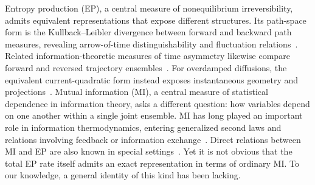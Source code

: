\documentclass[
 longbibliography,
 twocolumn,
 superscriptaddress,
 amsmath,
 amssymb,
 amsthm,
 amsfonts,
 prl,
 floatfix,
]{revtex4-2}
\begin{document}

Entropy production (EP), a central measure of nonequilibrium irreversibility, admits equivalent representations that expose different structures. Its path-space form is the Kullback–Leibler divergence between forward and backward path measures, revealing arrow-of-time distinguishability and fluctuation relations~\cite{Crooks1999Entropy, Maes2003time-reversal, Seifert2005Entropy, parrondo2009entropy, seifert2012stochastic}. Related information-theoretic measures of time asymmetry likewise compare forward and reversed trajectory ensembles~\cite{feng2008length}. For overdamped diffusions, the equivalent current-quadratic form instead exposes instantaneous geometry and projections~\cite{seifert2012stochastic,nakazato2021geometrical,dechant2022geometricPRR,dechant2022geometric,frishman2020learning}. Mutual information (MI), a central measure of statistical dependence in information theory, asks a different question: how variables depend on one another within a single joint ensemble. MI has long played an important role in information thermodynamics, entering generalized second laws and relations involving feedback or information exchange~\cite{Sagawa2010generalized,sagawa2013role,ito2013Informatioin,horowitz2014second,hartich2014stochastic,parrondo2015thermodynamics}. Direct relations between MI and EP are also known in special settings~\cite{diana2014mutual, dabelow2019irreversibility,louwerse2022information}. Yet it is not obvious that the total EP rate itself admits an exact representation in terms of ordinary MI. To our knowledge, a general identity of this kind has been lacking.
\end{document}
